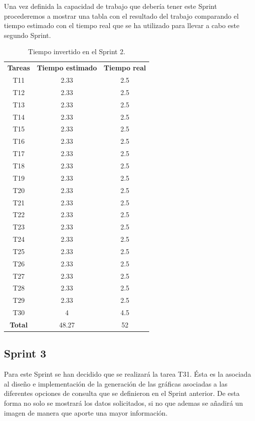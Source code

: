 Una vez definida la capacidad de trabajo que debería tener este Sprint procederemos a mostrar una tabla con el resultado del trabajo comparando el tiempo estimado con el tiempo real que se ha utilizado para llevar a cabo este segundo Sprint.

\begin{table}[H]
	\begin{center}
		\begin{tabular}{| c | c | c |}
			\hline
			
			\textbf{Tareas} & \textbf{Tiempo estimado} & \textbf{Tiempo real} \\
			T11 & 2.33 & 2.5 \\
			T12 & 2.33 & 2.5 \\
			T13 & 2.33 & 2.5 \\
			T14 & 2.33 & 2.5 \\
			T15 & 2.33 & 2.5 \\
			T16 & 2.33 & 2.5 \\
			T17 & 2.33 & 2.5 \\
			T18 & 2.33 & 2.5 \\
			T19 & 2.33 & 2.5 \\
			T20 & 2.33 & 2.5 \\
			T21 & 2.33 & 2.5 \\
			T22 & 2.33 & 2.5 \\
			T23 & 2.33 & 2.5 \\
			T24 & 2.33 & 2.5 \\
			T25 & 2.33 & 2.5 \\
			T26 & 2.33 & 2.5 \\
			T27 & 2.33 & 2.5 \\
			T28 & 2.33 & 2.5 \\
			T29 & 2.33 & 2.5 \\
			T30 & 4 & 4.5 \\
			\textbf{Total} & 48.27 & 52 \\ \hline
		\end{tabular}
		\caption{Tiempo invertido en el Sprint 2.}
	\end{center}
\end{table}

\subsection{Sprint 3}

Para este Sprint se han decidido que se realizará la tarea T31. Ésta es la asociada al diseño e implementación de la generación de las gráficas asociadas a las diferentes opciones de consulta que se definieron en el Sprint anterior. De esta forma no solo se mostrará los datos solicitados, si no que ademas se añadirá un imagen de manera que aporte una mayor información.

